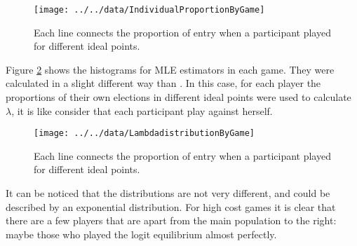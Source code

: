 \begin{figure}
	\centering
	\texttt{[image: ../../data/IndividualProportionByGame]}
	\caption[Individual Proportions]{Each line connects the proportion of entry when a participant played for different ideal points.}
	\label{fig:individualproportionbygame}
\end{figure}

Figure \ref{fig:lambdadistributionbygame} shows the histograms for MLE estimators in each game. They were calculated in a slight different way than  . In this case, for each player the proportions of their own elections in different ideal points were used to calculate $\lambda$, it is like consider that each participant play against herself.

\begin{figure}
	\centering
	\texttt{[image: ../../data/LambdadistributionByGame]}
	\caption[Individual Proportions]{Each line connects the proportion of entry when a participant played for different ideal points.}
	\label{fig:lambdadistributionbygame}
\end{figure}


It can be noticed that the distributions are not very different, and could be described by an exponential distribution. For high cost games it is clear that there are a few players that are apart from the main population to the right: maybe those who played the logit equilibrium almost perfectly.


